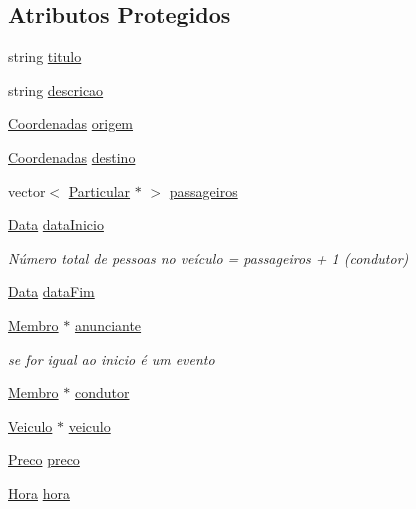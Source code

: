\subsection*{Atributos Protegidos}
\begin{DoxyCompactItemize}
\item 
string \hyperlink{class_anuncio_adb34bedd8220f42b9ee37662c21313e6}{titulo}
\item 
string \hyperlink{class_anuncio_aa6a9eb8d08cb06d16061b006eb2c8b97}{descricao}
\item 
\hyperlink{class_coordenadas}{Coordenadas} \hyperlink{class_anuncio_a9b3f8ac29ebf2a44e24ea2273064a7f5}{origem}
\item 
\hyperlink{class_coordenadas}{Coordenadas} \hyperlink{class_anuncio_acdac86595f84cfb8a2bf54c414857168}{destino}
\item 
vector$<$ \hyperlink{class_particular}{Particular} $\ast$ $>$ \hyperlink{class_anuncio_a76cdb1291df7bd8736141304d759ef35}{passageiros}
\item 
\hyperlink{class_data}{Data} \hyperlink{class_anuncio_abeb7d8c5fe5e7d127005044981a3cd3d}{data\+Inicio}
\begin{DoxyCompactList}\small\item\em Número total de pessoas no veículo = passageiros + 1 (condutor) \end{DoxyCompactList}\item 
\hyperlink{class_data}{Data} \hyperlink{class_anuncio_ac3b9182cc541cb68215f8aa09fb0e11a}{data\+Fim}
\item 
\hyperlink{class_membro}{Membro} $\ast$ \hyperlink{class_anuncio_a58250bfc8ab82d4308839b1e26213a0f}{anunciante}
\begin{DoxyCompactList}\small\item\em se for igual ao inicio é um evento \end{DoxyCompactList}\item 
\hyperlink{class_membro}{Membro} $\ast$ \hyperlink{class_anuncio_a8771818ef0855c6b70e2aca6c89e3177}{condutor}
\item 
\hyperlink{class_veiculo}{Veiculo} $\ast$ \hyperlink{class_anuncio_a3cffe1ce2024500bddaf07bd0f7ecc81}{veiculo}
\item 
\hyperlink{class_preco}{Preco} \hyperlink{class_anuncio_aa780fd8e07586a3af117fd20593fb1b4}{preco}
\item 
\hyperlink{class_hora}{Hora} \hyperlink{class_anuncio_aee851839cb45594b8ee550a032236cfe}{hora}
\end{DoxyCompactItemize}
